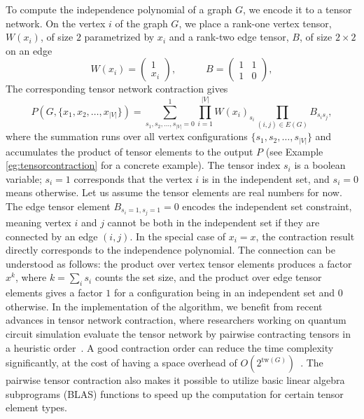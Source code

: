 \documentclass[onefignum, onetabnum]{siamart190516}
\newcommand{\<}{\langle}
\renewcommand{\>}{\rangle}
\newcounter{example}
\begin{document}
To compute the independence polynomial of a graph $G$, we encode it to a tensor network. On the vertex $i$ of the graph $G$, we place a rank-one vertex tensor, $W(x_i)$, of size $2$ parametrized by $x_{i}$ and a rank-two edge tensor, $B$, of size $2 \times 2$ on an edge
\begin{equation}
    W(x_i) = \left(\begin{matrix}
        1 \\
        x_i
    \end{matrix}\right),
    \qquad \quad 
       B = \left(\begin{matrix}
        1  & 1\\
        1 & 0
    \end{matrix}\right), \label{eq:tensor}
\end{equation}
The corresponding tensor network contraction gives
\begin{equation}
    P(G, \{x_1, x_{2}, \ldots,x_{|V|}\}) = \sum\limits_{s_1, s_2, \ldots, s_{|V|} = 0}^{1} \prod\limits_{i=1}^{|V|} W(x_i)_{s_i} \prod\limits_{(i,j) \in E(G)} B_{s_i s_j},
\end{equation}
where the summation runs over all vertex configurations $\{s_1, s_{2}, \ldots,s_{|V|}\}$ and accumulates the product of tensor elements to the output $P$ (see Example \ref{eg:tensorcontraction} for a concrete example).
The tensor index $s_i$ is a boolean variable; $s_{i} = 1$ corresponds that the vertex $i$ is in the independent set, and $s_{i} = 0$ means otherwise. Let us assume the tensor elements are real numbers for now.
The edge tensor element $B_{s_{i}=1, s_{j}=1} = 0$ encodes the independent set constraint, meaning vertex $i$ and $j$ cannot be both in the independent set if they are connected by an edge $(i,j)$.
In the special case of $x_i = x$, the contraction result directly corresponds to the independence polynomial.
The connection can be understood as follows: the product over vertex tensor elements produces a factor $x^k$, where $k=\sum_i s_i$ counts the set size,
and the product over edge tensor elements gives a factor $1$ for a configuration being in an independent set and $0$ otherwise. In the implementation of the algorithm, we benefit from recent advances in tensor network contraction,
where researchers working on quantum circuit simulation evaluate the tensor network by pairwise contracting tensors in a heuristic order~\cite{Gray2021, Pan2021}.
A good contraction order can reduce the time complexity significantly, at the cost of having a space overhead of $O(2^{\text{tw}(G)})$~\cite{Markov2008}.
The pairwise tensor contraction also makes it possible to utilize basic linear algebra subprograms (BLAS) functions to speed up the computation for certain tensor element types.
\end{document}
